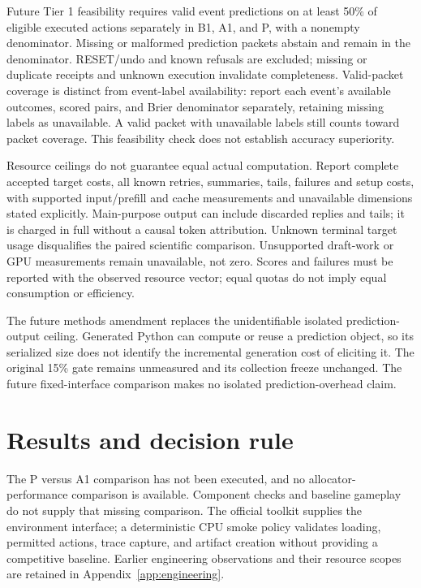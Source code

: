 \documentclass[11pt]{article}
\begin{document}
Future Tier 1 feasibility requires valid event predictions on at least 50\% of eligible executed actions separately in B1, A1, and P, with a nonempty denominator. Missing or malformed prediction packets abstain and remain in the denominator. RESET/undo and known refusals are excluded; missing or duplicate receipts and unknown execution invalidate completeness. Valid-packet coverage is distinct from event-label availability: report each event's available outcomes, scored pairs, and Brier denominator separately, retaining missing labels as unavailable. A valid packet with unavailable labels still counts toward packet coverage. This feasibility check does not establish accuracy superiority.

Resource ceilings do not guarantee equal actual computation. Report complete accepted target costs, all known retries, summaries, tails, failures and setup costs, with supported input/prefill and cache measurements and unavailable dimensions stated explicitly. Main-purpose output can include discarded replies and tails; it is charged in full without a causal token attribution. Unknown terminal target usage disqualifies the paired scientific comparison. Unsupported draft-work or GPU measurements remain unavailable, not zero. Scores and failures must be reported with the observed resource vector; equal quotas do not imply equal consumption or efficiency.

The future methods amendment replaces the unidentifiable isolated prediction-output ceiling. Generated Python can compute or reuse a prediction object, so its serialized size does not identify the incremental generation cost of eliciting it. The original 15\% gate remains unmeasured and its collection freeze unchanged. The future fixed-interface comparison makes no isolated prediction-overhead claim.

\section{Results and decision rule}
The P versus A1 comparison has not been executed, and no allocator-performance comparison is available. Component checks and baseline gameplay do not supply that missing comparison. The official toolkit\cite{sdk} supplies the environment interface; a deterministic CPU smoke policy validates loading, permitted actions, trace capture, and artifact creation without providing a competitive baseline. Earlier engineering observations and their resource scopes are retained in Appendix~\ref{app:engineering}.
\end{document}
